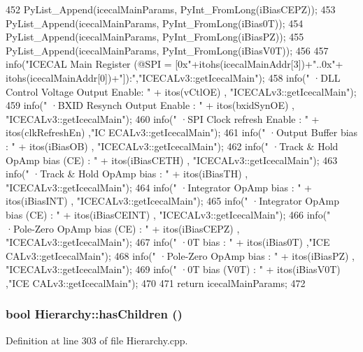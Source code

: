 \begin{DoxyCode}
{{452         PyList_Append(icecalMainParams, PyInt_FromLong(iBiasCEPZ));
453         PyList_Append(icecalMainParams, PyInt_FromLong(iBias0T));
454         PyList_Append(icecalMainParams, PyInt_FromLong(iBiasPZ));
455         PyList_Append(icecalMainParams, PyInt_FromLong(iBiasV0T));
456 
457         info("ICECAL Main Register (@SPI = [0x"+itohs(icecalMainAddr[3])+"..0x"+
      itohs(icecalMainAddr[0])+"]):","ICECALv3::getIcecalMain");
458         info("   ·DLL Control Voltage Output Enable: " + itos(vCtlOE)              ,
      "ICECALv3::getIcecalMain");
459         info("   ·BXID Resynch Output Enable       : " + itos(bxidSynOE)       ,
      "ICECALv3::getIcecalMain");
460         info("   ·SPI Clock refresh Enable         : " + itos(clkRefreshEn) ,"IC
      ECALv3::getIcecalMain");
461         info("   ·Output Buffer bias               : " + itos(iBiasOB)         ,
      "ICECALv3::getIcecalMain");
462         info("   ·Track & Hold OpAmp bias (CE)     : " + itos(iBiasCETH)       ,
      "ICECALv3::getIcecalMain");
463         info("   ·Track & Hold OpAmp bias          : " + itos(iBiasTH)         ,
      "ICECALv3::getIcecalMain");
464         info("   ·Integrator OpAmp bias            : " + itos(iBiasINT)            ,
      "ICECALv3::getIcecalMain");
465         info("   ·Integrator OpAmp bias (CE)       : " + itos(iBiasCEINT)      ,
      "ICECALv3::getIcecalMain");
466         info("   ·Pole-Zero OpAmp bias (CE)        : " + itos(iBiasCEPZ)       ,
      "ICECALv3::getIcecalMain");
467         info("   ·0T bias                   : " + itos(iBias0T)            ,"ICE
      CALv3::getIcecalMain");
468         info("   ·Pole-Zero OpAmp bias             : " + itos(iBiasPZ)         ,
      "ICECALv3::getIcecalMain");
469         info("   ·0T bias (V0T)             : " + itos(iBiasV0T)           ,"ICE
      CALv3::getIcecalMain");
470     }
471     return icecalMainParams;
472 }
\end{DoxyCode}
\hypertarget{classHierarchy_a255174fe4d316d2a3f430dcb9dab29f1}{
\subsubsection[{hasChildren}]{\setlength{\rightskip}{0pt plus 5cm}bool Hierarchy::hasChildren ()}}
\label{classHierarchy_a255174fe4d316d2a3f430dcb9dab29f1}


Definition at line 303 of file Hierarchy.cpp.

